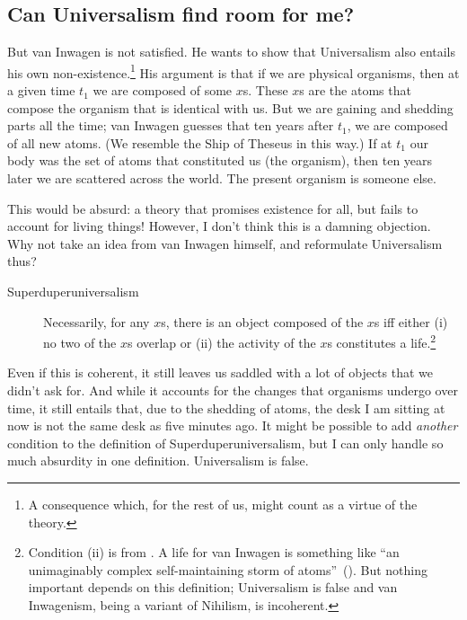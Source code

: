 \documentclass[11pt]{article}
\begin{document}
\begin{spacing}{1.5}
\subsection{Can Universalism find room for me?}
But van Inwagen is not satisfied. He wants to show that Universalism also entails his own non-existence.\footnote{A consequence which, for the rest of us, might count as a virtue of the theory.} His argument is that if we are physical organisms, then at a given time $t_{1}$ we are composed of some $x$s. These $x$s are the atoms that compose the organism that is identical with us. But we are gaining and shedding parts all the time; van Inwagen guesses that ten years after $t_{1}$, we are composed of all new atoms. (We resemble the Ship of Theseus in this way.) If at $t_{1}$ our body was the set of atoms that constituted us (the organism), then ten years later we are scattered across the world. The present organism is someone else.

This would be absurd: a theory that promises existence for all, but fails to account for living things! However, I don't think this is a damning objection. Why not take an idea from van Inwagen himself, and reformulate Universalism thus?
\begin{description}
	\item[Superduperuniversalism] Necessarily, for any $x$s, there is an object composed of the $x$s iff either (i) no two of the $x$s overlap or (ii) the activity of the $x$s constitutes a life.\footnote{Condition (ii) is from \citet[82]{inwagen1995}. A life for van Inwagen is something like ``an unimaginably complex self-maintaining storm of atoms''~(\citeyear[87]{inwagen1995}). But nothing important depends on this definition; Universalism is false and van Inwagenism, being a variant of Nihilism, is incoherent.}
\end{description}
Even if this is coherent, it still leaves us saddled with a lot of objects that we didn't ask for. And while it accounts for the changes that organisms undergo over time, it still entails that, due to the shedding of atoms, the desk I am sitting at now is not the same desk as five minutes ago. It might be possible to add {\em another} condition to the definition of Superduperuniversalism, but I can only handle so much absurdity in one definition. Universalism is false.


\end{spacing}
\end{document}
